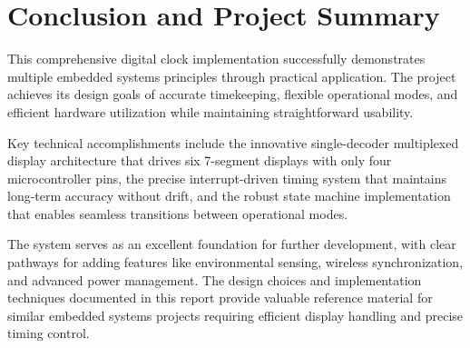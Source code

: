 \documentclass[a4paper,12pt]{article}
\begin{document}
\section{Conclusion and Project Summary}
This comprehensive digital clock implementation successfully demonstrates multiple embedded systems principles through practical application. The project achieves its design goals of accurate timekeeping, flexible operational modes, and efficient hardware utilization while maintaining straightforward usability.

Key technical accomplishments include the innovative single-decoder multiplexed display architecture that drives six 7-segment displays with only four microcontroller pins, the precise interrupt-driven timing system that maintains long-term accuracy without drift, and the robust state machine implementation that enables seamless transitions between operational modes.

The system serves as an excellent foundation for further development, with clear pathways for adding features like environmental sensing, wireless synchronization, and advanced power management. The design choices and implementation techniques documented in this report provide valuable reference material for similar embedded systems projects requiring efficient display handling and precise timing control.
\end{document}
